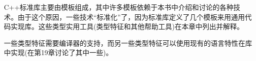 C++标准库主要由模板组成，其中许多模板依赖于本书中介绍和讨论的各种技术。由于这个原因，一些技术“标准化”了，因为标准库定义了几个模板来用通用代码实现库。这些类型实用工具(类型特征和其他帮助工具)在本章中列出并解释。

一些类型特征需要编译器的支持，而另一些类型特征可以使用现有的语言特性在库中实现(在第19章讨论了其中一些)。